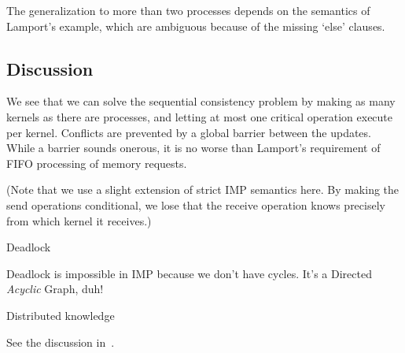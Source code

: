 \documentclass[11pt,fleqn,preprint]{impreport}
\begin{document}
The generalization to more than two processes depends on the semantics
of Lamport's example, which are ambiguous because of the missing
`else' clauses.

\subsection{Discussion}

We see that we can solve the sequential consistency problem by making
as many kernels as there are processes, and letting at most one
critical operation execute per kernel. Conflicts are prevented by a
global barrier between the updates. While a barrier sounds onerous, it
is no worse than Lamport's requirement of FIFO processing of memory
requests.

(Note that we use a slight extension of strict IMP semantics
here. By making the send operations conditional, we lose that the
receive operation knows precisely from which kernel it receives.)



 {Deadlock}

Deadlock is impossible in IMP because we don't have cycles. It's a
Directed \emph{Acyclic} Graph, duh!



 {Distributed knowledge}

See the discussion in~\cite{Goodell2011scalablempi}.



\end{document}
